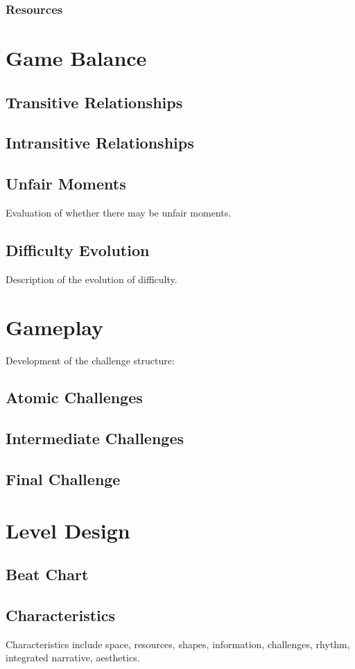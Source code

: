         \subsubsection{Resources}

\section{Game Balance}
    \subsection{Transitive Relationships}
    \subsection{Intransitive Relationships}
    \subsection{Unfair Moments}
    Evaluation of whether there may be unfair moments.
    \subsection{Difficulty Evolution}
    Description of the evolution of difficulty.

\section{Gameplay}
Development of the challenge structure:
    \subsection{Atomic Challenges}
    \subsection{Intermediate Challenges}
    \subsection{Final Challenge}

\section{Level Design}
    \subsection{Beat Chart}
    \subsection{Characteristics}
    Characteristics include space, resources, shapes, information, challenges, rhythm, integrated narrative, aesthetics.
